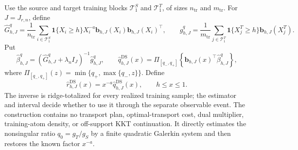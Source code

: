 Use the source and target training blocks \(\mathcal T^S_1\) and \(\mathcal T^T_1\), of sizes \(n_{\mathrm{tr}}\) and \(m_{\mathrm{tr}}\).  For \(J=J_{r,n}\), define
\[
 \widehat G^{q}_{h,J}=\frac1{n_{\mathrm{tr}}}
 \sum_{i\in\mathcal T^S_1}\mathbf 1\{X_i\ge h\}X_i^{-a}
 \mathbf b_{h,J}(X_i)\mathbf b_{h,J}(X_i)^\top,
 \qquad
 \widehat g^{q}_{h,J}=\frac1{m_{\mathrm{tr}}}
 \sum_{j\in\mathcal T^T_1}\mathbf 1\{X_j^T\ge h\}\mathbf b_{h,J}(X_j^T).
\]
Put
\[
 \widehat\beta^{q}_{h,J}=(\widehat G^{q}_{h,J}+\lambda_nI_J)^{-1}\widehat g^{q}_{h,J},
 \qquad
 \widehat q^{\mathrm{DS}}_{h,J}(x)=
 \Pi_{[q_-,q_+]}\!\left\{\mathbf b_{h,J}(x)^\top\widehat\beta^{q}_{h,J}\right\},
\]
where \(\Pi_{[q_-,q_+]}(z)=\min\{q_+,\max\{q_-,z\}\}\).  Define
\[
 \widehat r^{\mathrm{DS}}_{h,J}(x)=x^{-a}\widehat q^{\mathrm{DS}}_{h,J}(x),
 \qquad h\le x\le1.
\]
The inverse is ridge-totalized for every realized training sample; the estimator and interval decide whether to use it through the separate observable event.  The construction contains no transport plan, optimal-transport cost, dual multiplier, training-atom density, or off-support KKT continuation.  It directly estimates the nonsingular ratio \(q_0=g_T/g_S\) by a finite quadratic Galerkin system and then restores the known factor \(x^{-a}\).